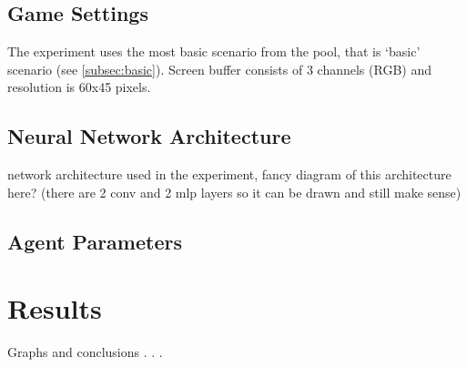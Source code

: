 	\subsection{Game Settings}
		The experiment uses the most basic scenario from the pool, that is `basic' scenario (see \ref{subsec:basic}). Screen buffer consists of 3 channels (RGB) and resolution is 60x45 pixels.

	\subsection{Neural Network Architecture}
		network architecture used in the experiment, fancy diagram of this architecture here? (there are 2 conv and 2 mlp layers so it can be drawn and still make sense)
	\subsection{Agent Parameters}

\section{Results}
Graphs and conclusions . . .